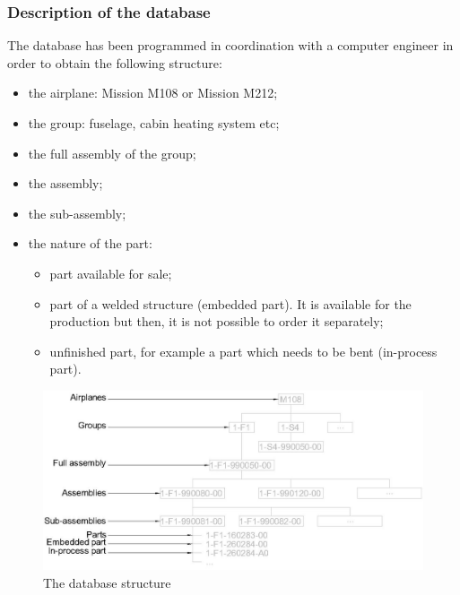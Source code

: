 \documentclass[11pt,a4paper]{article}
\begin{document}
\subsubsection{Description of the database}
The database has been programmed in coordination with a computer engineer in order to obtain the following structure:
\begin{itemize}
\setlength{\itemsep}{0pt}
\item the airplane: Mission M108 or Mission M212;
\item the group: fuselage, cabin heating system etc;
\item the full assembly of the group;
\item the assembly;
\item the sub-assembly;
\item the nature of the part: 
\begin{itemize}
\setlength{\itemsep}{0pt}
\item part available for sale;
\item part of a welded structure (embedded part). It is available for the production but then, it is not possible to order it separately;
\item unfinished part, for example a part which needs to be bent (in-process part).
\end{itemize}

\end{itemize}
\begin{figure}[ht!]
	\begin{center}
		\includegraphics[width=15cm]{pics/PIC024.jpg}
		\caption{The database structure}
		\label{fig:PIC024}
	\end{center}
\end{figure}
\end{document}
